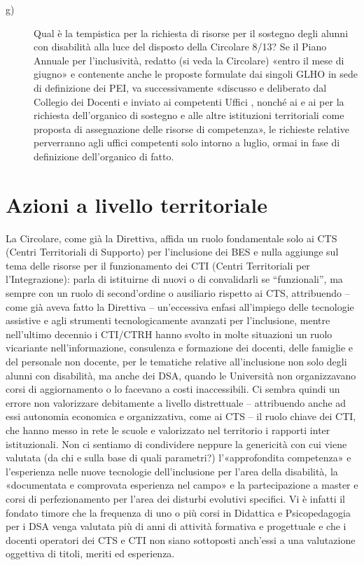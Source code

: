\begin{description}
	\item[g)] Qual è la tempistica per la richiesta di risorse per il sostegno degli alunni con disabilità alla luce del disposto della Circolare 8/13? Se il Piano Annuale per l'inclusività, redatto (si veda la Circolare) «entro il mese di giugno» e contenente anche le proposte formulate dai singoli GLHO in sede di definizione dei PEI, va successivamente «discusso e deliberato dal Collegio dei Docenti e inviato ai competenti Uffici  , nonché ai  e ai   per la richiesta dell'organico di sostegno e alle altre istituzioni territoriali come proposta di assegnazione delle risorse di competenza», le richieste relative perverranno agli uffici competenti solo intorno a luglio, ormai in fase di definizione dell'organico di fatto.
	\end{description}
\section*{Azioni a livello territoriale}
La Circolare, come già la Direttiva, affida un ruolo fondamentale solo ai CTS (Centri Territoriali di Supporto) per l'inclusione dei BES e nulla aggiunge sul tema delle risorse per il funzionamento dei CTI (Centri Territoriali per l'Integrazione): parla di istituirne di nuovi o di convalidarli se “funzionali”, ma sempre con un ruolo di second'ordine o ausiliario rispetto ai CTS, attribuendo – come già aveva fatto la Direttiva – un'eccessiva enfasi all'impiego delle tecnologie assistive e agli strumenti tecnologicamente avanzati per l'inclusione, mentre nell'ultimo decennio i CTI/CTRH hanno svolto in molte situazioni un ruolo vicariante nell'informazione, consulenza e formazione dei  docenti, delle famiglie e del personale non docente, per le tematiche relative all'inclusione non solo degli alunni con disabilità, ma anche dei DSA, quando le Università non organizzavano corsi di aggiornamento o lo facevano a costi inaccessibili.
Ci sembra quindi un errore non valorizzare debitamente a livello distrettuale – attribuendo anche ad essi autonomia economica e organizzativa, come ai CTS – il ruolo chiave dei CTI, che hanno messo in rete le scuole e valorizzato nel territorio i rapporti inter istituzionali.
Non ci sentiamo di condividere neppure la genericità con cui viene valutata (da chi e sulla base di quali parametri?) l’«approfondita competenza» e l'esperienza nelle nuove tecnologie dell'inclusione per l'area della disabilità, la «documentata e comprovata esperienza nel campo» e la partecipazione a master e corsi di perfezionamento per l'area dei disturbi evolutivi specifici. Vi è infatti il fondato timore che la frequenza di uno o più corsi in Didattica e Psicopedagogia per i DSA venga valutata più di anni di attività formativa e progettuale e che i docenti operatori dei CTS e CTI non siano sottoposti anch'essi a una valutazione oggettiva di titoli, meriti ed esperienza.

